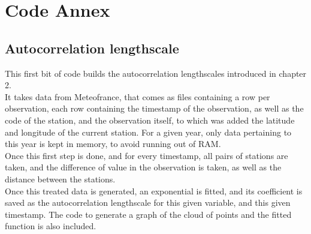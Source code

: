 \renewcommand{\thesection}{\arabic{chapter}.\arabic{section}}

\chapter*{Code Annex}
\label{chap:code}
\cleardoublepage
\doublespacing

\section*{Autocorrelation lengthscale}

This first bit of code builds the autocorrelation lengthscales introduced in chapter 2.\\

It takes data from Meteofrance, that comes as files containing a row per observation, each row containing the timestamp of the observation, as well as the code of the station, and the observation itself, to which was added the latitude and longitude of the current station. For a given year, only data pertaining to this year is kept in memory, to avoid running out of RAM. \\

Once this first step is done, and for every timestamp, all pairs of stations are taken, and the difference of value in the observation is taken, as well as the distance between the stations. \\

Once this treated data is generated, an exponential is fitted, and its coefficient is saved as the autocorrelation lengthscale for this given variable, and this given timestamp. The code to generate a graph of the cloud of points and the fitted function is also included.\\



